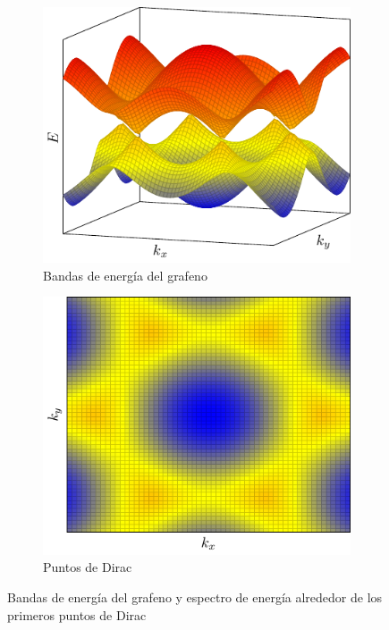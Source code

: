 \begin{figure}[!httb]
    \centering
    \begin{subfigure}[b]{0.43\linewidth}
        \centering
        \includegraphics[width=\linewidth]{figures/bandGraphene2.pdf}
    \caption{Bandas de energía del grafeno}
    \label{fig:grapheneEnergy1}
    \end{subfigure}
    \hfill
    \begin{subfigure}[b]{0.43\linewidth}
        \centering
        \includegraphics[width=\linewidth]{figures/bandGraphene1.pdf}
    \caption{Puntos de Dirac}
    \label{fig:grapheneEnergy2}
    \end{subfigure}
    \caption{Bandas de energía del grafeno y espectro de energía alrededor de los primeros puntos de Dirac}
\end{figure}
